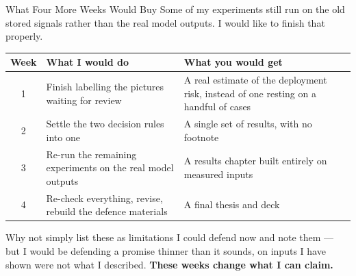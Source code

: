\documentclass[aspectratio=169,11pt]{beamer}
\begin{document}
\begin{frame}{What Four More Weeks Would Buy}
\small
Some of my experiments still run on the old stored signals rather than the real model outputs. I would like to finish that properly.
\vspace{2mm}
\begin{center}
\scriptsize
\renewcommand{\arraystretch}{1.0}
\begin{tabular}{@{}c p{5.6cm} p{5.6cm}@{}}
\toprule
\textbf{Week} & \textbf{What I would do} & \textbf{What you would get} \\
\midrule
1 & Finish labelling the pictures waiting for review & A real estimate of the deployment risk, instead of one resting on a handful of cases \\
2 & Settle the two decision rules into one & A single set of results, with no footnote \\
3 & Re-run the remaining experiments on the real model outputs & A results chapter built entirely on measured inputs \\
4 & Re-check everything, revise, rebuild the defence materials & A final thesis and deck \\
\bottomrule
\end{tabular}
\end{center}
\vspace{1mm}
\begin{alertblock}{\small Why not simply list these as limitations}
\footnotesize I could defend now and note them --- but I would be defending a promise thinner than it sounds, on inputs I have shown were not what I described. \textbf{These weeks change what I can claim.}
\end{alertblock}
\end{frame}
\end{document}
